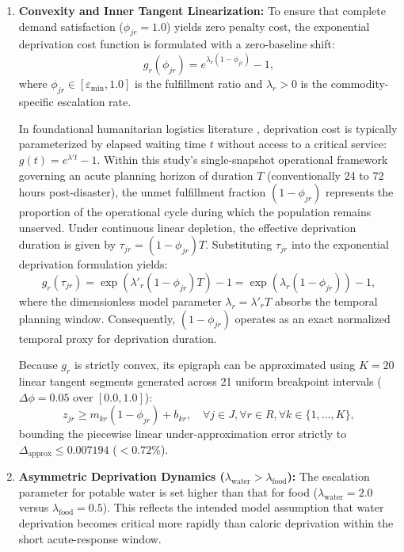 \begin{enumerate}
    \item \textbf{Convexity and Inner Tangent Linearization:} To ensure that complete demand satisfaction ($\phi_{jr} = 1.0$) yields zero penalty cost, the exponential deprivation cost function is formulated with a zero-baseline shift:
\begin{equation}
    g_r(\phi_{jr}) = e^{\lambda_r(1-\phi_{jr})} - 1,
\end{equation}
where $\phi_{jr} \in [\varepsilon_{\min}, 1.0]$ is the fulfillment ratio and $\lambda_r > 0$ is the commodity-specific escalation rate.

In foundational humanitarian logistics literature \citep{gutjahr2018}, deprivation cost is typically parameterized by elapsed waiting time $t$ without access to a critical service: $g(t) = e^{\lambda' t} - 1$. Within this study's single-snapshot operational framework governing an acute planning horizon of duration $T$ (conventionally 24 to 72 hours post-disaster), the unmet fulfillment fraction $(1-\phi_{jr})$ represents the proportion of the operational cycle during which the population remains unserved. Under continuous linear depletion, the effective deprivation duration is given by $\tau_{jr} = (1-\phi_{jr})T$. Substituting $\tau_{jr}$ into the exponential deprivation formulation yields:
\begin{equation}
    g_r(\tau_{jr}) = \exp\left(\lambda'_r (1-\phi_{jr})T\right) - 1 = \exp\left(\lambda_r(1-\phi_{jr})\right) - 1, 
\end{equation}
where the dimensionless model parameter $\lambda_r = \lambda'_r T$ absorbs the temporal planning window. Consequently, $(1-\phi_{jr})$ operates as an exact normalized temporal proxy for deprivation duration.

Because $g_r$ is strictly convex, its epigraph can be approximated using $K = 20$ linear tangent segments generated across 21 uniform breakpoint intervals ($\Delta \phi = 0.05$ over $[0.0, 1.0]$):
\begin{equation}
    z_{jr} \ge m_{kr}(1 - \phi_{jr}) + b_{kr}, \quad \forall j \in J, \forall r \in R, \forall k \in \{1, \dots, K\},
\end{equation}
bounding the piecewise linear under-approximation error strictly to $\Delta_{\text{approx}} \le 0.007194$ ($< 0.72\%$).


    \item \textbf{Asymmetric Deprivation Dynamics ($\lambda_{\text{water}}>\lambda_{\text{food}}$):} The escalation parameter for potable water is set higher than that for food ($\lambda_{\text{water}}=2.0$ versus $\lambda_{\text{food}}=0.5$). This reflects the intended model assumption that water deprivation becomes critical more rapidly than caloric deprivation within the short acute-response window.


\end{enumerate}
